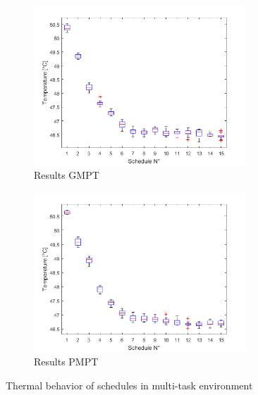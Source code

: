 \begin{figure}[H]
\begin{subfigure}{.5\textwidth}
  \centering
  \includegraphics[height=6cm]{figures/gmpt_m_pi}
  \caption{Results GMPT}
  \label{fig:i_evgm_pi}
\end{subfigure}%
\begin{subfigure}{.5\textwidth}
  \centering
  \includegraphics[height=6cm]{figures/pmpt_m_pi}
  \caption{Results PMPT}
  \label{fig:i_evpm_pi}
\end{subfigure}
\caption[Results Multi-Task Raspberry]{Thermal behavior of schedules in multi-task environment}
\label{fig:i_eva_gp_m_pi}
\end{figure}